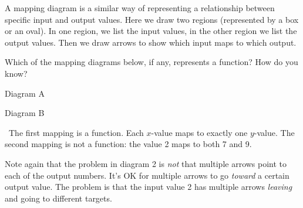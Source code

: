 A \gls{mapping diagram} is a similar way of representing a relationship between specific input and output values. Here we draw two regions (represented by a box or an oval). In one region, we list the input values, in the other region we list the output values. Then we draw arrows to show which input maps to which output.

\begin{boxedex}
Which of the mapping diagrams below, if any, represents a function? How do you know?

\begin{minipage}{0.5\textwidth}
\centering
Diagram A
\par{}
\end{minipage}
\begin{minipage}{0.5\textwidth}
\centering
Diagram B
\par{}
\end{minipage}

\exsoln\ The first mapping is a function. Each $x$-value maps to exactly one $y$-value. The second mapping is not a function: the value 2 maps to both 7 and 9.
\end{boxedex}

Note again that the problem in diagram 2 is \textit{not} that multiple arrows point to each of the output numbers. It's OK for multiple arrows to go \textit{toward} a certain output value. The problem is that the input value 2 has multiple arrows \textit{leaving} and going to different targets.

